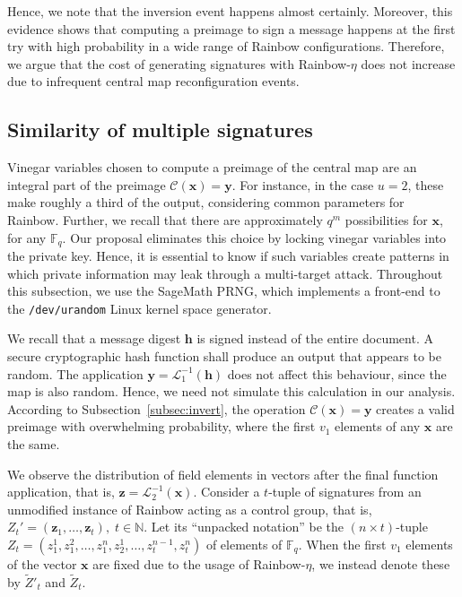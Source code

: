 \documentclass[english]{ufsc-thesis-rn46-2019/ufsc-thesis-rn46-2019}
\theoremstyle{definition}
\begin{document}
Hence, we note that the inversion event happens almost certainly. Moreover,
this evidence shows that computing a preimage to sign a message happens at the
first try with high probability in a wide range of Rainbow
configurations. Therefore, we argue that the cost of generating signatures with
Rainbow-$\eta$ does not increase due to infrequent central map reconfiguration
events.

\subsection{Similarity of multiple signatures}\label{subsec:similar}

Vinegar variables chosen to compute a preimage of the central map are an
integral part of the preimage $\mathcal{C}(\mathbf{x}) = \mathbf{y}$. For
instance, in the case $u = 2$, these make roughly a third of the output,
considering common parameters for Rainbow. Further, we recall that there are
approximately $q^{m}$ possibilities for $\mathbf{x}$, for any
$\mathbb{F}_{q}$. Our proposal eliminates this choice by locking vinegar
variables into the private key. Hence, it is essential to know if such
variables create patterns in which private information may leak through
a multi-target attack. Throughout this subsection, we use the SageMath PRNG,
which implements a front-end to the \texttt{/dev/urandom} Linux kernel space
generator.

We recall that a message digest $\mathbf{h}$ is signed instead of the entire
document. A secure cryptographic hash function shall produce an output that
appears to be random. The application
$\mathbf{y} = \mathcal{L}_{1}^{-1}(\mathbf{h})$ does not affect this behaviour,
since the map is also random. Hence, we need not simulate this calculation in
our analysis. According to Subsection~\ref{subsec:invert}, the operation
$\mathcal{C}(\mathbf{x}) = \mathbf{y}$ creates a valid preimage with
overwhelming probability, where the first $v_{1}$ elements of any $\mathbf{x}$
are the same.

We observe the distribution of field elements in vectors after the final
function application, that is,
$\mathbf{z} = \mathcal{L}_{2}^{-1}(\mathbf{x})$. Consider a $t$-tuple of
signatures from an unmodified instance of Rainbow acting as a control group,
that is,
$Z_{t}' = (\mathbf{z}_{1}, \dots, \mathbf{z}_{t}),\; t \in \mathbb{N}$. Let its
``unpacked notation'' be the $(n \times t)$-tuple
$Z_{t} = (z_{1}^{1}, z_{1}^{2}, \dots, z_{1}^{n}, z_{2}^{1},
  \dots, z_{t}^{n - 1}, z_{t}^{n})$
of elements of $\mathbb{F}_{q}$. When the first $v_{1}$ elements of the vector
$\mathbf{x}$ are fixed due to the usage of Rainbow-$\eta$, we instead denote
these by $\widetilde{Z}'_{t}$ and $\widetilde{Z}_{t}$.
\end{document}
